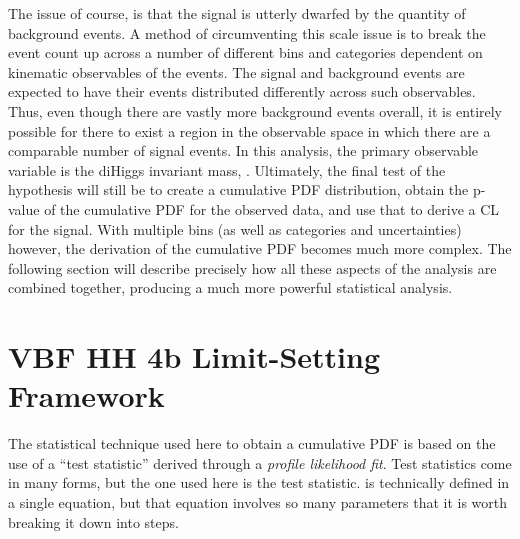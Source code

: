     The issue of course, is that the signal is utterly dwarfed by the quantity of background events.
    A method of circumventing this scale issue
        is to break the event count up across a number of different
        bins and categories dependent on kinematic observables of the events.
    The signal and background events are expected to have their events distributed differently across such observables.
    Thus, even though there are vastly more background events overall,
        it is entirely possible for there to exist a region in the observable space
        in which there are a comparable number of signal events.
    In this analysis, the primary observable variable is the diHiggs invariant mass, \mhh.
    Ultimately, the final test of the hypothesis will still be to create a cumulative PDF distribution,
        obtain the p-value of the cumulative PDF for the observed data, and use that to derive a CL for the signal.
    With multiple bins (as well as categories and uncertainties) however,
        the derivation of the cumulative PDF becomes much more complex.
    The following section will describe precisely how all these aspects of the analysis are combined together,
        producing a much more powerful statistical analysis.


\FloatBarrier
\section{VBF HH 4b Limit-Setting Framework}
    
    The statistical technique used here to obtain a cumulative PDF
        is based on the use of a ``test statistic'' derived through a \textit{profile likelihood fit}.
    Test statistics come in many forms, but the one used here is the \qtil test statistic.
    \qtil is technically defined in a single equation,
        but that equation involves so many parameters that it is worth breaking it down into steps.


